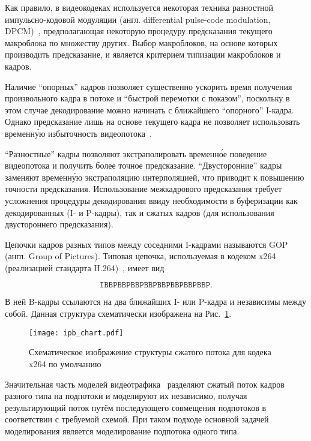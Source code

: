 Как правило, в видеокодеках используется некоторая техника
разностной импульсно-кодовой модуляции (англ. differential
pulse-code modulation, DPCM)~\cite{sklarbook}, предполагающая некоторую
процедуру предсказания текущего макроблока по множеству других.
Выбор макроблоков, на основе которых производить предсказание,
и является критерием типизации макроблоков и кадров.

Наличие ``опорных'' кадров позволяет существенно ускорить
время получения произвольного кадра в потоке и ``быстрой
перемотки с показом'', поскольку в этом случае декодирование
можно начинать с ближайшего ``опорного'' I-кадра.
Однако предсказание лишь на основе текущего кадра не
позволяет использовать временн\'{у}ю избыточность
видеопотока~\cite{salomoncomp}.

``Разностные'' кадры позволяют
экстраполировать временн\'{о}е поведение видеопотока
и получить более точное предсказание. ``Двусторонние''
кадры заменяют временн\'{у}ю экстраполяцию интерполяцией,
что приводит к повышению точности предсказания.
Использование межкадрового предсказания требует
усложнения процедуры декодирования ввиду необходимости в
буферизации как декодированных (I- и P-кадры), так и
сжатых кадров (для использования двустороннего предсказания).

Цепочки кадров разных типов между соседними I-кадрами называются
GOP (англ. Group of Pictures). Типовая цепочка, используемая
в кодеком x264 (реализацией стандарта H.264)~\cite{x264page},
имеет вид

$$
\mathtt{IBBPBBPBBPBBPBBPBBPBBPBBP}.
$$

В ней B-кадры
ссылаются на два ближайших I- или P-кадра и независимы
между собой. Данная структура схематически изображена
на Рис.~\ref{fig:ipb_frames}.

\begin{figure}[h]
    \begin{center}
        \texttt{[image: ipb\_chart.pdf]}
    \end{center}
    \caption{Схематическое изображение структуры сжатого потока
    для кодека x264 по умолчанию}
    \label{fig:ipb_frames}
\end{figure}

Значительная часть моделей видеотрафика~\cite{survey2013} разделяют
сжатый поток кадров разного типа на подпотоки и моделируют
их независимо, получая результирующий поток путём последующего
совмещения подпотоков в соответствии с требуемой схемой.
При таком подходе основной задачей моделирования является
моделирование подпотока одного типа.

